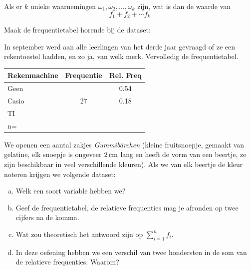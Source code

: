 \documentclass[12pt,twoside,a4paper]{article}
\begin{document}
\begin{oefening}
Als er $k$ unieke waarnemingen $\omega_1, \omega_2, \ldots, \omega_k$ zijn, wat is dan de waarde van
$$f_1 + f_2 + \cdots f_k$$
\end{oefening}

\begin{oefening}
Maak de frequentietabel horende bij de dataset:
\end{oefening}

\begin{oefening}
In september werd aan alle leerlingen van het derde jaar gevraagd of ze een rekentoestel hadden, en zo ja, van welk merk. Vervolledig de frequentietabel.
\begin{center}
\begin{tabular}{l|c|c}
Rekenmachine & Frequentie & Rel. Freq \\\hline
Geen         &            & 0.54      \\\hline
Casio        & 27         & 0.18      \\\hline
TI           &            &           \\\hline
n=           &            &           \\
\end{tabular}
\end{center}
\end{oefening}

\begin{oefening}
 We openen een aantal zakjes {\em Gummibärchen} (kleine fruitsnoepje, gemaakt van gelatine, elk snoepje is ongeveer $2 \cm$ lang en heeft de vorm van een beertje, ze zijn beschikbaar in veel verschillende kleuren). Als we van elk beertje de kleur noteren krijgen we volgende dataset:


\begin{enumerate}[(a)]
\item Welk een soort variable hebben we?
\item Geef de frequentietabel, de relatieve frequenties mag je afronden op twee cijfers na de komma.
\item Wat zou theoretisch het antwoord zijn op $\sum_{i=1}^n f_i$.
\item In deze oefening hebben we een verschil van twee hondersten in de som van de relatieve frequenties. Waarom?
\end{enumerate}
\end{oefening}
\end{document}

